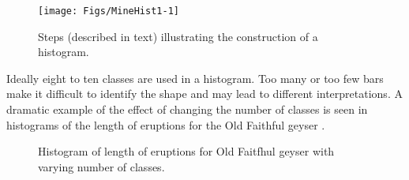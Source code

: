 \documentclass[10pt,openany]{book}\usepackage[]{graphicx}\usepackage[]{color}
\newenvironment{knitrout}{}{} %
\begin{document}
\begin{knitrout}
\color{fgcolor}\begin{figure}[hbtp]

{\centering \texttt{[image: Figs/MineHist1-1]} 

}

\caption[Steps (described in text) illustrating the construction of a histogram]{Steps (described in text) illustrating the construction of a histogram.}\label{fig:MineHist1}
\end{figure}


\end{knitrout}

Ideally eight to ten classes are used in a histogram. Too many or too few bars make it difficult to identify the shape and may lead to different interpretations. A dramatic example of the effect of changing the number of classes is seen in histograms of the length of eruptions for the Old Faithful geyser .

\begin{knitrout}
\color{fgcolor}


















































\begin{figure}[hbtp]

{\centering {}

}

\caption[Histogram of length of eruptions for Old Faitfhul geyser with varying number of classes]{Histogram of length of eruptions for Old Faitfhul geyser with varying number of classes.}\label{fig:histOF}
\end{figure}


\end{knitrout}
\end{document}
